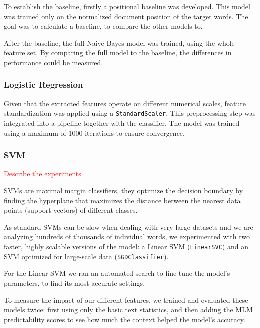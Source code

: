 \documentclass[11pt]{article}
\begin{document}
To establish the baseline, firstly a positional baseline was developed. This model was trained only on the normalized document position of the target words.
The goal was to calculate a baseline, to compare the other models to.

After the baseline, the full Naive Bayes model was trained, using the whole feature set.
By comparing the full model to the baseline, the differences in performance could be measured.


\subsubsection{Logistic Regression}


Given that the extracted features operate on different numerical scales, feature standardization was applied using a \texttt{StandardScaler}.
This preprocessing step was integrated into a pipeline together with the classifier.
The model was trained using a maximum of 1000 iterations to ensure convergence.


\subsubsection{SVM}

\textcolor{red}{Describe the experiments}

SVMs are maximal margin classifiers, they optimize the decision boundary by finding the hyperplane that maximizes the distance between
the nearest data points (support vectors) of different classes.

As standard SVMs can be slow when dealing with very large datasets and we are analyzing hundreds of thousands of individual words,
we experimented with two faster, highly scalable versions of the model:
a Linear SVM (\texttt{LinearSVC}) and an SVM optimized for large-scale data (\texttt{SGDClassifier}).

For the Linear SVM we ran an automated search to fine-tune the model's parameters, to find its most accurate settings.

To measure the impact of our different features, we trained and evaluated these models twice:
first using only the basic text statistics, and then adding the MLM predictability scores
to see how much the context helped the model's accuracy.
\end{document}
